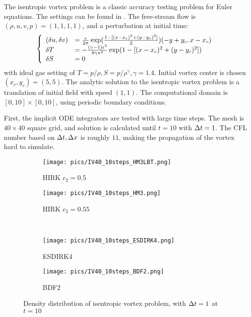 \documentclass[preprint,12pt]{elsarticle}
\begin{document}
The isentropic vortex problem is a classic
accuracy testing problem for Euler equations.
The settings can be found in \cite{hu1999weighted_WENO}.
The free-stream flow is $(\rho,u,v,p)=(1,1,1,1)$,
and a perturbation at initial time:
\begin{equation}
    \left\{
    \begin{array}[2]{ll}
        (\delta u, \delta v) & = \frac{\epsilon}{2\pi}\exp(\frac{1-[(x-x_c)^2+(y-y_c)^2]}{2})(-y+y_c,x-x_c) \\
        \delta T             & = - \frac{(\gamma-1)\epsilon^2}{8\gamma\pi^2}\exp(1-[(x-x_c)^2+(y-y_c)^2])   \\
        \delta S             & = 0                                                                          \\
    \end{array}
    \right.
\end{equation}
with ideal gas setting of $T = p/\rho, S= p/\rho^\gamma, \gamma =1.4$.
Initial vortex center is chosen $(x_c,y_c)=(5,5)$.
The analytic solution to the isentropic vortex problem is a
translation of initial field with speed $(1,1)$.
The computational domain is $[0,10]\times[0,10]$,
using periodic boundary conditions.

First, the implicit ODE integrators are tested with large
time steps.
The mesh is $40\times40$ square grid,
and solution is calculated until $t=10$ with $\mathrm\Delta t=1$.
The CFL number based on $\mathrm\Delta t, \mathrm\Delta x$ is roughly $11$,
making the propagation of the vortex hard to
simulate.

\begin{figure}[htbp]
    \centering
    \begin{subfigure}{0.5\textwidth}
        \texttt{[image: pics/IV40\_10steps\_HM3LBT.png]}
        \caption[]{HIRK $c_2=0.5$}
        \label{sfig:IV10Step_HM3LBT}
    \end{subfigure}\hfill
    \begin{subfigure}{0.5\textwidth}
        \texttt{[image: pics/IV40\_10steps\_HM3.png]}
        \caption[]{HIRK $c_2=0.55$}
        \label{sfig:IV10Step_HM3}
    \end{subfigure}\\
    \begin{subfigure}{0.5\textwidth}
        \texttt{[image: pics/IV40\_10steps\_ESDIRK4.png]}
        \caption[]{ESDIRK4}
        \label{sfig:IV10Step_ESDIRK4}
    \end{subfigure}\hfill
    \begin{subfigure}{0.5\textwidth}
        \texttt{[image: pics/IV40\_10steps\_BDF2.png]}
        \caption[]{BDF2}
        \label{sfig:IV10Step_BDF2}
    \end{subfigure}
    \caption{Density distribution of isentropic vortex problem, with $\mathrm\Delta t = 1$ at $t=10$}
    \label{fig:IV10Step}
\end{figure}
\end{document}
